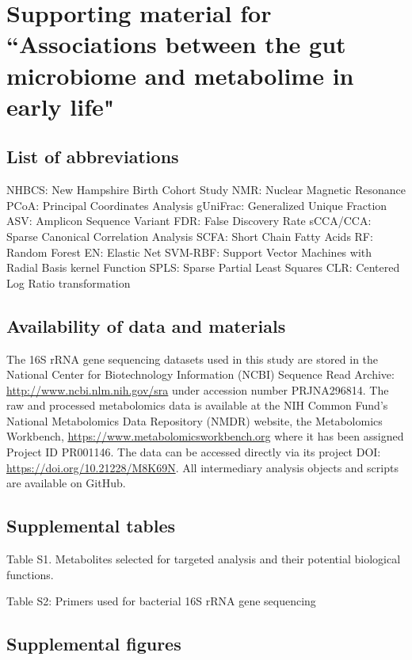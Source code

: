 \chapter{Supporting material for ``Associations between the gut microbiome and metabolime in early life"}

\section{List of abbreviations}
NHBCS: New Hampshire Birth Cohort Study
NMR: Nuclear Magnetic Resonance
PCoA: Principal Coordinates Analysis
gUniFrac: Generalized Unique Fraction 
ASV: Amplicon Sequence Variant
FDR: False Discovery Rate
sCCA/CCA: Sparse Canonical Correlation Analysis
SCFA: Short Chain Fatty Acids
RF: Random Forest
EN: Elastic Net
SVM-RBF: Support Vector Machines with Radial Basis kernel Function
SPLS: Sparse Partial Least Squares
CLR:  Centered Log Ratio transformation

\section{Availability of data and materials}

The 16S rRNA gene sequencing datasets used in this study are stored in the National Center for Biotechnology Information (NCBI) Sequence Read Archive: \url{http://www.ncbi.nlm.nih.gov/sra} under accession number PRJNA296814. The raw and processed metabolomics data is available at the NIH Common Fund's National Metabolomics Data Repository (NMDR) website, the Metabolomics Workbench, \url{https://www.metabolomicsworkbench.org} where it has been assigned Project ID PR001146. The data can be accessed directly via its project DOI: \url{https://doi.org/10.21228/M8K69N}. All intermediary analysis objects and scripts are available on GitHub. 

\section{Supplemental tables}
Table S1. Metabolites selected for targeted analysis and their potential biological functions.

Table S2: Primers used for bacterial 16S rRNA gene sequencing 

\section{Supplemental figures}

